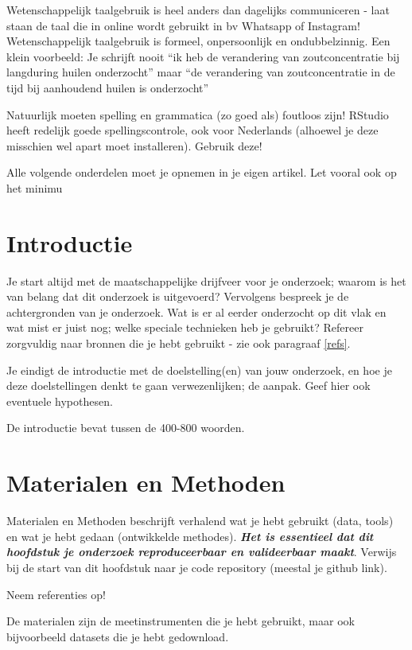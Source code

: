 \documentclass[
]{article}
\begin{document}
Wetenschappelijk taalgebruik is heel anders dan dagelijks communiceren - laat staan de taal die in online wordt gebruikt in bv Whatsapp of Instagram! Wetenschappelijk taalgebruik is formeel, onpersoonlijk en ondubbelzinnig.
Een klein voorbeeld: Je schrijft nooit ``ik heb de verandering van zoutconcentratie bij langduring huilen onderzocht'' maar ``de verandering van zoutconcentratie in de tijd bij aanhoudend huilen is onderzocht''

Natuurlijk moeten spelling en grammatica (zo goed als) foutloos zijn! RStudio heeft redelijk goede spellingscontrole, ook voor Nederlands (alhoewel je deze misschien wel apart moet installeren). Gebruik deze!

Alle volgende onderdelen moet je opnemen in je eigen artikel. Let vooral ook op het minimu

\hypertarget{introductie}{%
\section{Introductie}\label{introductie}}

Je start altijd met de maatschappelijke drijfveer voor je onderzoek; waarom is het van belang dat dit onderzoek is uitgevoerd?
Vervolgens bespreek je de achtergronden van je onderzoek. Wat is er al eerder onderzocht op dit vlak en wat mist er juist nog; welke speciale technieken heb je gebruikt? Refereer zorgvuldig naar bronnen die je hebt gebruikt - zie ook paragraaf \ref{refs}.

Je eindigt de introductie met de doelstelling(en) van jouw onderzoek, en hoe je deze doelstellingen denkt te gaan verwezenlijken; de aanpak. Geef hier ook eventuele hypothesen.

De introductie bevat tussen de 400-800 woorden.

\hypertarget{materialen-en-methoden}{%
\section{Materialen en Methoden}\label{materialen-en-methoden}}

Materialen en Methoden beschrijft verhalend wat je hebt gebruikt (data, tools) en wat je hebt gedaan (ontwikkelde methodes). \textbf{\emph{Het is essentieel dat dit hoofdstuk je onderzoek reproduceerbaar en valideerbaar maakt}}. Verwijs bij de start van dit hoofdstuk naar je code repository (meestal je github link).

Neem referenties op!

De materialen zijn de meetinstrumenten die je hebt gebruikt, maar ook bijvoorbeeld datasets die je hebt gedownload.
\end{document}
